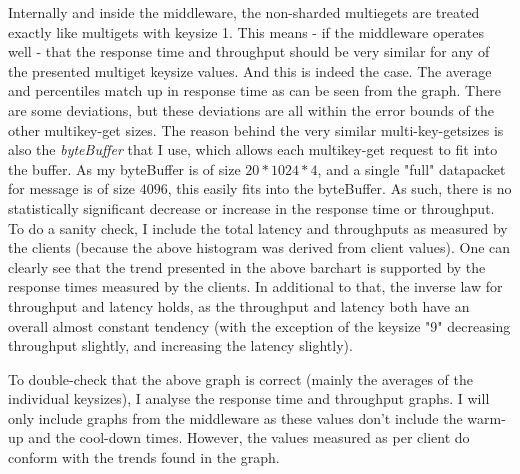 \documentclass[11pt,a4paper]{article}
\begin{document}
Internally and inside the middleware, the non-sharded multiegets are treated exactly like multigets with keysize 1.
This means - if the middleware operates well - that the response time and throughput should be very similar for any of the presented multiget keysize values.
And this is indeed the case. 
The average and percentiles match up in response time as can be seen from the graph.
There are some deviations, but these deviations are all within the error bounds of the other multikey-get sizes.
The reason behind the very similar multi-key-getsizes is also the \textit{byteBuffer} that I use, which allows each multikey-get request to fit into the buffer.
As my byteBuffer is of size $20 * 1024 * 4$, and a single "full" datapacket for message is of size $ 4096 $, this easily fits into the byteBuffer.
As such, there is no statistically significant decrease or increase in the response time or throughput. \\

To do a sanity check, I include the total latency and throughputs as measured by the clients (because the above histogram was derived from client values).
One can clearly see that the trend presented in the above barchart is supported by the response times measured by the clients.
In additional to that, the inverse law for throughput and latency holds, as the throughput and latency both have an overall almost constant tendency (with the exception of the keysize "9" decreasing throughput slightly, and increasing the latency slightly).

To double-check that the above graph is correct (mainly the averages of the individual keysizes), I analyse the response time and throughput graphs.
I will only include graphs from the middleware as these values don't include the warm-up and the cool-down times.
However, the values measured as per client do conform with the trends found in the graph. 
\end{document}
